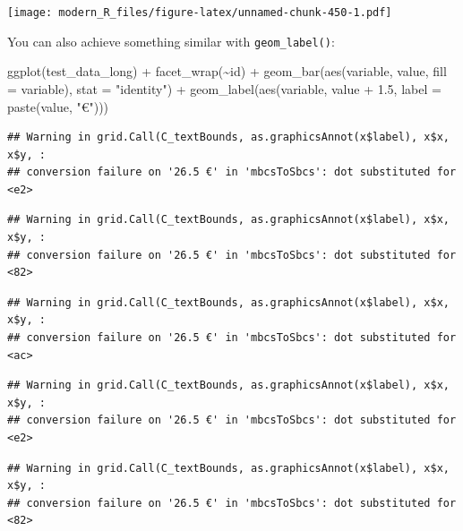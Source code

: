 \documentclass[
]{article}
\newenvironment{Shaded}{\begin{snugshade}}{\end{snugshade}}
\newcommand{\AttributeTok}[1]{\textcolor[rgb]{0.77,0.63,0.00}{#1}}
\newcommand{\FloatTok}[1]{\textcolor[rgb]{0.00,0.00,0.81}{#1}}
\newcommand{\FunctionTok}[1]{\textcolor[rgb]{0.00,0.00,0.00}{#1}}
\newcommand{\NormalTok}[1]{#1}
\newcommand{\SpecialCharTok}[1]{\textcolor[rgb]{0.00,0.00,0.00}{#1}}
\newcommand{\StringTok}[1]{\textcolor[rgb]{0.31,0.60,0.02}{#1}}
\begin{document}
\texttt{[image: modern\_R\_files/figure-latex/unnamed-chunk-450-1.pdf]}

You can also achieve something similar with \texttt{geom\_label()}:

\begin{Shaded}
\begin{Highlighting}[]
\FunctionTok{ggplot}\NormalTok{(test\_data\_long) }\SpecialCharTok{+}
  \FunctionTok{facet\_wrap}\NormalTok{(}\SpecialCharTok{\textasciitilde{}}\NormalTok{id) }\SpecialCharTok{+}
  \FunctionTok{geom\_bar}\NormalTok{(}\FunctionTok{aes}\NormalTok{(variable, value, }\AttributeTok{fill =}\NormalTok{ variable), }\AttributeTok{stat =} \StringTok{"identity"}\NormalTok{) }\SpecialCharTok{+}
  \FunctionTok{geom\_label}\NormalTok{(}\FunctionTok{aes}\NormalTok{(variable, value }\SpecialCharTok{+} \FloatTok{1.5}\NormalTok{, }\AttributeTok{label =} \FunctionTok{paste}\NormalTok{(value, }\StringTok{"€"}\NormalTok{)))}
\end{Highlighting}
\end{Shaded}

\begin{verbatim}
## Warning in grid.Call(C_textBounds, as.graphicsAnnot(x$label), x$x, x$y, :
## conversion failure on '26.5 €' in 'mbcsToSbcs': dot substituted for <e2>
\end{verbatim}

\begin{verbatim}
## Warning in grid.Call(C_textBounds, as.graphicsAnnot(x$label), x$x, x$y, :
## conversion failure on '26.5 €' in 'mbcsToSbcs': dot substituted for <82>
\end{verbatim}

\begin{verbatim}
## Warning in grid.Call(C_textBounds, as.graphicsAnnot(x$label), x$x, x$y, :
## conversion failure on '26.5 €' in 'mbcsToSbcs': dot substituted for <ac>
\end{verbatim}

\begin{verbatim}
## Warning in grid.Call(C_textBounds, as.graphicsAnnot(x$label), x$x, x$y, :
## conversion failure on '26.5 €' in 'mbcsToSbcs': dot substituted for <e2>
\end{verbatim}

\begin{verbatim}
## Warning in grid.Call(C_textBounds, as.graphicsAnnot(x$label), x$x, x$y, :
## conversion failure on '26.5 €' in 'mbcsToSbcs': dot substituted for <82>
\end{verbatim}
\end{document}
